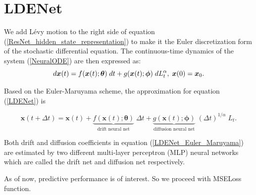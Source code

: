 \section{LDENet}

We add Lévy motion to the right side of equation (\ref{ResNet_hidden_state_representation}) to make it the Euler discretization form of the stochastic differential equation. The continuous-time dynamics of the system (\ref{NeuralODE}) are then expressed as:
\begin{equation}\label{LDENet}
d\boldsymbol{x}(t) = f(\boldsymbol{x}(t); \boldsymbol{\theta}) \; dt + g(\boldsymbol{x}(t); \boldsymbol{\phi}) \; dL_t^{\alpha}, \; \boldsymbol{x}(0) = \boldsymbol{x}_0.
\end{equation}

Based on the Euler-Maruyama scheme, the approximation for equation (\ref{LDENet}) is

\begin{equation}\label{LDENet_Euler_Maruyama}
\boldsymbol{x}(t+\Delta t) = \boldsymbol{x}(t)+ \underbrace{f(\boldsymbol{x}(t); \boldsymbol{\theta})}_{\text{drift neural net}} \; \Delta t + \underbrace{g(\boldsymbol{x}(t); \boldsymbol{\phi})}_{\text{diffusion neural net}} \; (\Delta t)^{1 / \alpha} \; L_t.
\end{equation}

Both drift and diffusion coefficients in equation (\ref{LDENet_Euler_Maruyama}) are estimated by two different multi-layer
perceptron (MLP) neural networks which are called the drift net and diffusion net respectively. \cite{yang2022neuralnetworkstochasticdifferential}

As of now, predictive performance is of interest. So we proceed with MSELoss function.
\clearpage